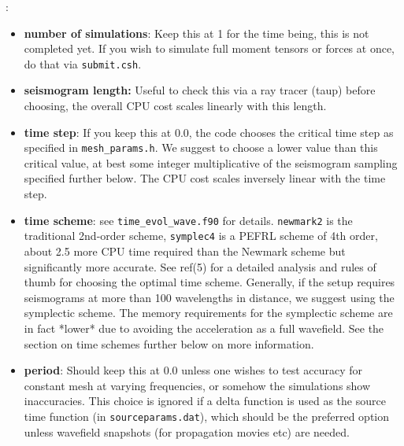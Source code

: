 \documentclass[11pt,letter,fleqn,english,notitlepage]{article}
\begin{document}
\lstset{frame=single,basicstyle=\footnotesize, breaklines=true }

%
:
\begin{itemize}
    \item \textbf{number of simulations}: Keep this at 1 for the time being,
    this is not completed yet.  If you wish to simulate full moment tensors or
    forces at once, do that via {\tt submit.csh}.

    \item \textbf{seismogram length:} Useful to check this via a ray tracer
    (taup) before choosing, the overall CPU cost scales linearly with this
    length.

    \item \textbf{time step}: If you keep this at 0.0, the code chooses the
    critical time step as specified in {\tt mesh\_params.h}.  We suggest to
    choose a lower value than this critical value, at best some  integer
    multiplicative of the seismogram sampling specified further below. The CPU
    cost scales inversely linear with the time step.

    \item \textbf{time scheme}: see {\tt time\_evol\_wave.f90} for details.
    {\tt newmark2} is the traditional 2nd-order scheme, {\tt symplec4} is a
    PEFRL scheme of 4th order, about 2.5 more CPU time required than the
    Newmark scheme but significantly more accurate. See ref(5) for a detailed
    analysis and rules of thumb for choosing the optimal time scheme.
    Generally, if the setup requires seismograms at more than 100 wavelengths
    in distance, we suggest using the symplectic scheme. The memory
    requirements for the symplectic scheme are in fact *lower* due to avoiding
    the acceleration as a full wavefield. See the section on time schemes
    further below on more information.
    
    \item \textbf{period}: Should keep this at 0.0 unless one wishes to test
    accuracy for constant mesh at varying frequencies, or somehow the
    simulations show inaccuracies. This choice is ignored if a delta function
    is used as the source time function (in {\tt sourceparams.dat}), which
    should be the preferred option unless wavefield snapshots (for propagation
    movies etc) are needed. 


\end{itemize}
\end{document}

